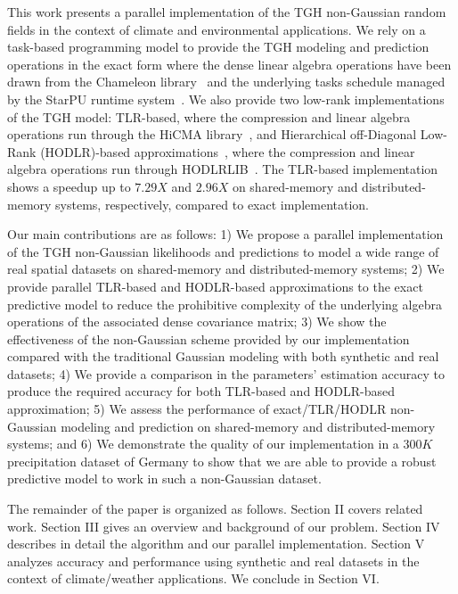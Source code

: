 \documentclass[conference]{IEEEtran}
\begin{document}
This work presents a parallel implementation of the 
TGH non-Gaussian random fields in the context of climate and environmental applications.
We rely on a task-based programming model to provide
the TGH modeling and prediction operations in the exact form where the dense linear algebra operations have been drawn from 
the Chameleon library~\cite{agullo2017achieving}
and the underlying tasks schedule managed by the StarPU 
runtime system~\cite{augonnet2011starpu}. We also provide two low-rank implementations 
of the TGH model: TLR-based, where the compression and linear algebra operations run through the HiCMA library~\cite{hicma-soft}, and 
Hierarchical off-Diagonal Low-Rank (HODLR)-based approximations~\cite{hodlr-soft}, where the 
compression and linear algebra operations run through HODLRLIB~\cite{hodlr-soft, ambikasaran2013mathcal}.
The TLR-based implementation shows a 
speedup up to $7.29X$ and $2.96X$ on shared-memory and distributed-memory systems, respectively, compared
to exact implementation.

Our main contributions are as follows: 1) We propose a 
parallel implementation of the TGH non-Gaussian likelihoods and predictions to model a wide range of real spatial 
datasets on shared-memory and distributed-memory systems; 2) We provide parallel TLR-based and HODLR-based approximations to the exact predictive model to reduce the 
prohibitive complexity of the underlying algebra operations of the associated dense covariance matrix; 3) We show the effectiveness 
of the non-Gaussian scheme provided by our implementation compared with the traditional Gaussian modeling with both synthetic and real datasets; 4) We provide a comparison in the parameters' estimation accuracy to 
produce  the required accuracy  for both  TLR-based  and HODLR-based approximation; 5) We assess the performance of exact/TLR/HODLR non-Gaussian 
modeling and prediction on shared-memory and distributed-memory systems; and 6) We demonstrate the quality of our 
implementation in a $300K$ precipitation dataset of Germany to show that we are 
able to provide a robust predictive model to work in such a non-Gaussian dataset.


The remainder of the paper is organized as follows. 
Section II covers related work. Section III gives an overview and background of our problem. Section IV describes in detail 
the algorithm and our parallel implementation. Section V analyzes accuracy and performance using synthetic and real
datasets in the context of climate/weather applications. 
We conclude in Section VI.
\end{document}
